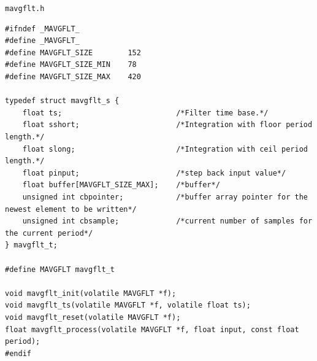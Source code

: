 \documentclass[11pt,a4paper,oneside]{book}
\numberwithin{equation}{section}
\theoremstyle{it}
\theoremstyle{definition}
\begin{document}
\begin{mybox}
\begin{center}
	{\selectfont \verb+mavgflt.h+}
\end{center}
{\selectfont \footnotesize \noindent
	\begin{verbatim}
#ifndef _MAVGFLT_
#define _MAVGFLT_
#define MAVGFLT_SIZE        152
#define MAVGFLT_SIZE_MIN    78
#define MAVGFLT_SIZE_MAX    420

typedef struct mavgflt_s {
	float ts;                          /*Filter time base.*/
	float sshort;                      /*Integration with floor period length.*/
	float slong;                       /*Integration with ceil period length.*/
	float pinput;                      /*step back input value*/
	float buffer[MAVGFLT_SIZE_MAX];    /*buffer*/
	unsigned int cbpointer;            /*buffer array pointer for the newest element to be written*/
	unsigned int cbsample;             /*current number of samples for the current period*/
} mavgflt_t;

#define MAVGFLT mavgflt_t

void mavgflt_init(volatile MAVGFLT *f);
void mavgflt_ts(volatile MAVGFLT *f, volatile float ts);
void mavgflt_reset(volatile MAVGFLT *f);
float mavgflt_process(volatile MAVGFLT *f, float input, const float period);
#endif
\end{verbatim}}
\end{mybox}
\end{document}
